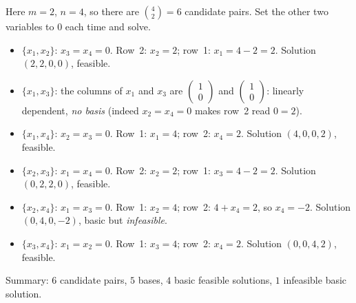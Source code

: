 \begin{solutions}
  \item Here $m=2$, $n=4$, so there are $\binom{4}{2}=6$ candidate pairs.
        Set the other two variables to $0$ each time and solve.
        \begin{itemize}[leftmargin=1.8em,itemsep=0.3ex]
          \item $\{x_{1},x_{2}\}$: $x_{3}=x_{4}=0$. Row~2: $x_{2}=2$;
                row~1: $x_{1}=4-2=2$. Solution $(2,2,0,0)$, feasible.
          \item $\{x_{1},x_{3}\}$: the columns of $x_{1}$ and $x_{3}$ are
                $\begin{pmatrix}1\\0\end{pmatrix}$ and
                $\begin{pmatrix}1\\0\end{pmatrix}$: linearly dependent,
                \emph{no basis} (indeed $x_{2}=x_{4}=0$ makes row~2 read
                $0=2$).
          \item $\{x_{1},x_{4}\}$: $x_{2}=x_{3}=0$. Row~1: $x_{1}=4$;
                row~2: $x_{4}=2$. Solution $(4,0,0,2)$, feasible.
          \item $\{x_{2},x_{3}\}$: $x_{1}=x_{4}=0$. Row~2: $x_{2}=2$;
                row~1: $x_{3}=4-2=2$. Solution $(0,2,2,0)$, feasible.
          \item $\{x_{2},x_{4}\}$: $x_{1}=x_{3}=0$. Row~1: $x_{2}=4$;
                row~2: $4+x_{4}=2$, so $x_{4}=-2$. Solution $(0,4,0,-2)$,
                basic but \emph{infeasible}.
          \item $\{x_{3},x_{4}\}$: $x_{1}=x_{2}=0$. Row~1: $x_{3}=4$;
                row~2: $x_{4}=2$. Solution $(0,0,4,2)$, feasible.
        \end{itemize}
        Summary: $6$ candidate pairs, $5$ bases, $4$ basic feasible
        solutions, $1$ infeasible basic solution.


\end{solutions}
